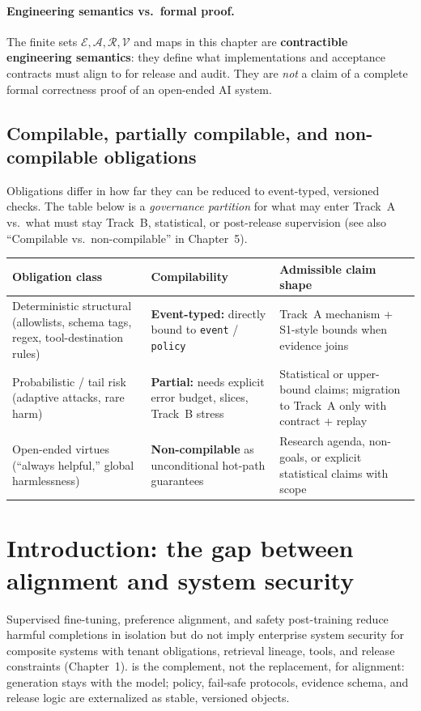 \documentclass[11pt,a4paper]{report}
\begin{document}
\paragraph{Engineering semantics vs.\ formal proof.} The finite sets \(\mathcal{E},\mathcal{A},\mathcal{R},\mathcal{V}\) and maps in this chapter are \textbf{contractible engineering semantics}: they define what implementations and acceptance contracts must align to for release and audit. They are \emph{not} a claim of a complete formal correctness proof of an open-ended AI system.

\subsection{Compilable, partially compilable, and non-compilable obligations}
Obligations differ in how far they can be reduced to event-typed, versioned checks. The table below is a \emph{governance partition} for what may enter Track~A vs.\ what must stay Track~B, statistical, or post-release supervision (see also ``Compilable vs.\ non-compilable'' in Chapter~5).

\begin{center}
\footnotesize
\begin{tabular}{@{}p{}p{}p{}@{}}
\toprule
\textbf{Obligation class} & \textbf{Compilability} & \textbf{Admissible claim shape} \\
\midrule
Deterministic structural (allowlists, schema tags, regex, tool-destination rules) & \textbf{Event-typed:} directly bound to \texttt{event} / \texttt{policy} & Track~A mechanism + S1-style bounds when evidence joins \\
Probabilistic / tail risk (adaptive attacks, rare harm) & \textbf{Partial:} needs explicit error budget, slices, Track~B stress & Statistical or upper-bound claims; migration to Track~A only with contract + replay \\
Open-ended virtues (``always helpful,'' global harmlessness) & \textbf{Non-compilable} as unconditional hot-path guarantees & Research agenda, non-goals, or explicit statistical claims with scope \\
\bottomrule
\end{tabular}
\end{center}

\section{Introduction: the gap between alignment and system security}
Supervised fine-tuning, preference alignment, and safety post-training reduce harmful completions in isolation but do not imply enterprise system security for composite systems with tenant obligations, retrieval lineage, tools, and release constraints (Chapter~1). \DecoupledSafety{} is the complement, not the replacement, for alignment: generation stays with the model; policy, fail-safe protocols, evidence schema, and release logic are externalized as stable, versioned objects.
\end{document}

